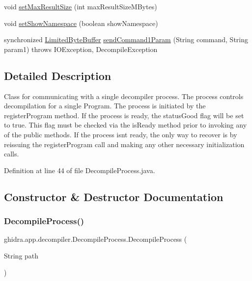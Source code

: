 \begin{DoxyCompactItemize}
\item 
void \mbox{\hyperlink{classghidra_1_1app_1_1decompiler_1_1_decompile_process_a789f75a2a43bd5a85a88442c9cc1710d}{set\+Max\+Result\+Size}} (int max\+Result\+Size\+M\+Bytes)
\item 
void \mbox{\hyperlink{classghidra_1_1app_1_1decompiler_1_1_decompile_process_a86fcccae24b54cd29f7936b7aae7ece8}{set\+Show\+Namespace}} (boolean show\+Namespace)
\item 
synchronized \mbox{\hyperlink{classghidra_1_1app_1_1decompiler_1_1_limited_byte_buffer}{Limited\+Byte\+Buffer}} \mbox{\hyperlink{classghidra_1_1app_1_1decompiler_1_1_decompile_process_a07d6213d3257b394022e7b8d13a3746e}{send\+Command1\+Param}} (String command, String param1)  throws I\+O\+Exception, 			\+Decompile\+Exception 
\end{DoxyCompactItemize}


\subsection{Detailed Description}
Class for communicating with a single decompiler process. The process controls decompilation for a single Program. The process is initiated by the register\+Program method. If the process is ready, the status\+Good flag will be set to true. This flag must be checked via the is\+Ready method prior to invoking any of the public methods. If the process isn\textquotesingle{}t ready, the only way to recover is by reissuing the register\+Program call and making any other necessary initialization calls. 

Definition at line 44 of file Decompile\+Process.\+java.



\subsection{Constructor \& Destructor Documentation}
\mbox{\label{classghidra_1_1app_1_1decompiler_1_1_decompile_process_a1d87e3793a82ac3421528f78ce195b17}} 
\subsubsection{\texorpdfstring{DecompileProcess()}{DecompileProcess()}}
{\footnotesize\ttfamily ghidra.\+app.\+decompiler.\+Decompile\+Process.\+Decompile\+Process (\begin{DoxyParamCaption}\item[{String}]{path }\end{DoxyParamCaption})\hspace{0.3cm}{\ttfamily [inline]}}



